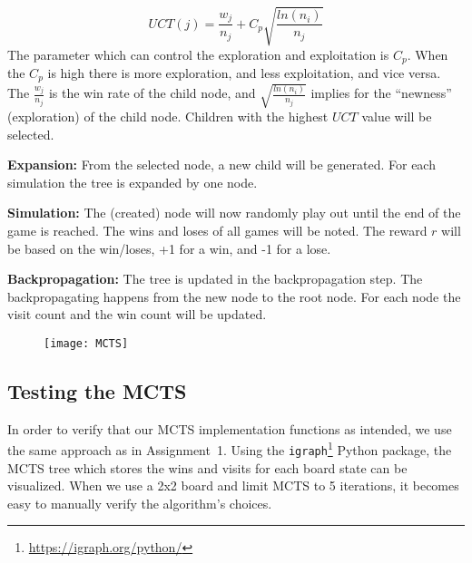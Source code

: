 \documentclass{article}
\begin{document}
\begin{equation}
UCT(j) = \frac{w_j}{n_j} + C_p \sqrt{\frac{ln(n_i)}{n_j}}
\end{equation}
The parameter which can control the exploration and exploitation is $C_p$. When the $C_p$ is high there is more exploration, and less exploitation, and vice versa. The $\frac{w_j}{n_j}$ is the win rate of the child node, and $\sqrt{\frac{ln(n_i)}{n_j}}$ implies for the ``newness'' (exploration) of the child node. Children with the highest $UCT$ value will be selected.

\textbf{Expansion:} From the selected node, a new child will be generated. For each simulation the tree is expanded by one node.

\textbf{Simulation:} The (created) node will now randomly play out until the end of the game is reached. The wins and loses of all games will be noted. The reward $r$ will be based on the win/loses, +1 for a win, and -1 for a lose.

\textbf{Backpropagation:} The tree is updated in the backpropagation step. The backpropagating happens from the new node to the root node. For each node the visit count and the win count will be updated.

\begin{figure}[h]
\centering
\texttt{[image: MCTS]}
\label{fig:MCTS}
\end{figure}

\subsection{Testing the MCTS}
In order to verify that our MCTS implementation functions as intended, we use the same approach as in Assignment~1. Using the \texttt{igraph}\footnote{\url{https://igraph.org/python/}} Python package, the MCTS tree which stores the wins and visits for each board state can be visualized. When we use a 2x2 board and limit MCTS to 5 iterations, it becomes easy to manually verify the algorithm's choices. 
\end{document}
